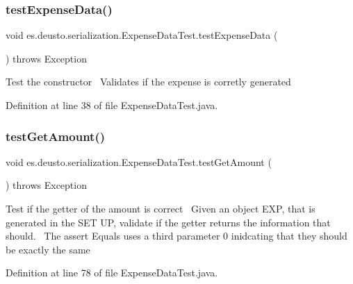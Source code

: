 \subsubsection{\texorpdfstring{test\+Expense\+Data()}{testExpenseData()}}
{\footnotesize\ttfamily void es.\+deusto.\+serialization.\+Expense\+Data\+Test.\+test\+Expense\+Data (\begin{DoxyParamCaption}{ }\end{DoxyParamCaption}) throws Exception}

Test the constructor~\newline
 Validates if the expense is corretly generated~\newline
 

Definition at line 38 of file Expense\+Data\+Test.\+java.

\mbox{\label{classes_1_1deusto_1_1serialization_1_1_expense_data_test_a23166488d596924308d8a4f800b15537}} 
\subsubsection{\texorpdfstring{test\+Get\+Amount()}{testGetAmount()}}
{\footnotesize\ttfamily void es.\+deusto.\+serialization.\+Expense\+Data\+Test.\+test\+Get\+Amount (\begin{DoxyParamCaption}{ }\end{DoxyParamCaption}) throws Exception}

Test if the getter of the amount is correct~\newline
Given an object E\+XP, that is generated in the S\+ET UP, validate if the getter returns the information that should.~\newline
The assert Equals uses a third parameter 0 inidcating that they should be exactly the same 

Definition at line 78 of file Expense\+Data\+Test.\+java.

\mbox{\label{classes_1_1deusto_1_1serialization_1_1_expense_data_test_a5f156cec176af911325693341f82b644}} 

